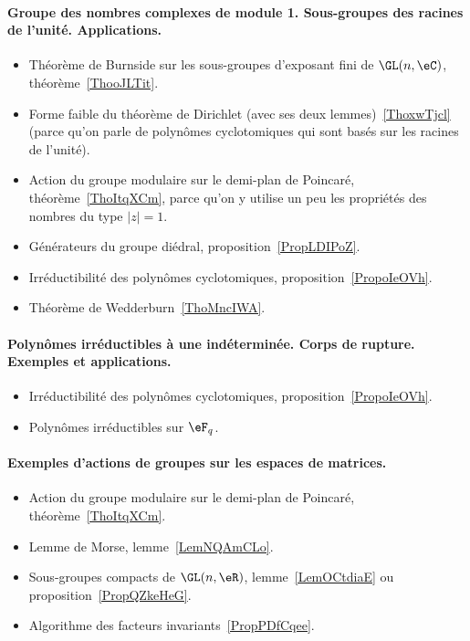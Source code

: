 \paragraph{Groupe des nombres complexes de module 1. Sous-groupes des racines de l'unité. Applications.}
\begin{itemize}
    \item Théorème de Burnside sur les sous-groupes d'exposant fini de \( \GL(n,\eC)\), théorème~\ref{ThooJLTit}.
    \item Forme faible du théorème de Dirichlet (avec ses deux lemmes)~\ref{ThoxwTjcl} (parce qu'on parle de polynômes cyclotomiques qui sont basés sur les racines de l'unité).
    \item Action du groupe modulaire sur le demi-plan de Poincaré, théorème~\ref{ThoItqXCm}, parce qu'on y utilise un peu les propriétés des nombres du type \( | z |=1\).
    \item Générateurs du groupe diédral, proposition~\ref{PropLDIPoZ}.
    \item Irréductibilité des polynômes cyclotomiques, proposition~\ref{PropoIeOVh}.
    \item Théorème de Wedderburn~\ref{ThoMncIWA}.
\end{itemize}

\paragraph{Polynômes irréductibles à une indéterminée. Corps de rupture. Exemples et applications.}
\begin{itemize}
    \item Irréductibilité des polynômes cyclotomiques, proposition~\ref{PropoIeOVh}.
    \item Polynômes irréductibles sur \( \eF_q\).
\end{itemize}
\paragraph{Exemples d'actions de groupes sur les espaces de matrices.}
\begin{itemize}
    \item Action du groupe modulaire sur le demi-plan de Poincaré, théorème~\ref{ThoItqXCm}.
    \item Lemme de Morse, lemme~\ref{LemNQAmCLo}.
    \item Sous-groupes compacts de \( \GL(n,\eR)\), lemme~\ref{LemOCtdiaE} ou proposition~\ref{PropQZkeHeG}.
    \item Algorithme des facteurs invariants~\ref{PropPDfCqee}.
\end{itemize}
